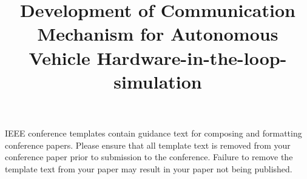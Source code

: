 \documentclass[conference]{config/paper/IEEEtran}
\begin{document}
\title{Development of Communication Mechanism for Autonomous Vehicle
	Hardware-in-the-loop-simulation}



\maketitle













\printbibliography

\vspace{12pt}
\color{red}
IEEE conference templates contain guidance text for composing and formatting conference papers. Please ensure that all template text is removed from your conference paper prior to submission to the conference. Failure to remove the template text from your paper may result in your paper not being published.
\end{document}
